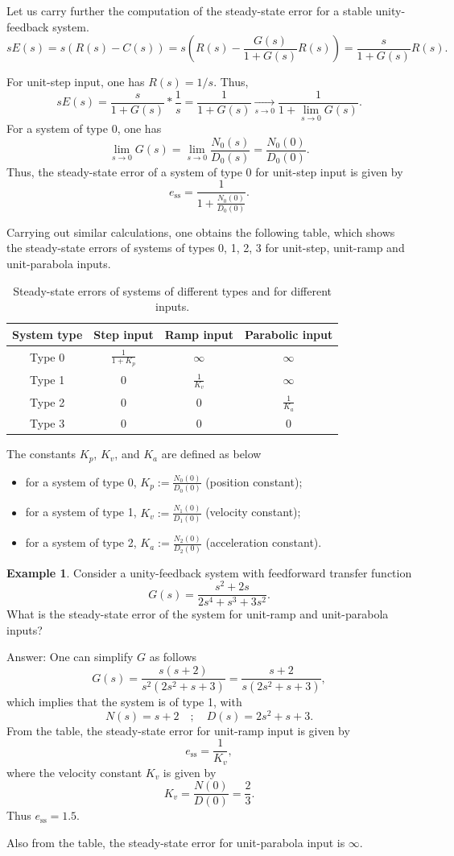 \documentclass[a4paper,11pt]{report}
\theoremstyle{definition}
\newcommand{\sse}{\mathrm{ss}}
\newtheorem{mdexample}{Example}
\newenvironment{example}%
  {\vspace{0.1cm}\begin{mdframed}[backgroundcolor=lightgray]\begin{mdexample}}%
  {\end{mdexample}\end{mdframed}\vspace{0.1cm}}
\begin{document}
Let us carry further the computation of the steady-state error for a
stable unity-feedback system.
\[
sE(s) = s(R(s)-C(s)) = s\left(R(s)-\frac{G(s)}{1+G(s)}R(s)\right)=\frac{s}{1+G(s)}R(s).
\]

For unit-step input, one has $R(s)=1/s$. Thus,
\[
sE(s) = \frac{s}{1+G(s)}*\frac{1}{s} = \frac{1}{1+G(s)}
\xrightarrow[s\to 0]{}\frac{1}{1+\lim_{s\to 0}G(s)}.
\]
For a system of type 0, one has
\[
\lim_{s\to 0}G(s) = \lim_{s\to 0}\frac{N_0(s)}{D_0(s)} = \frac{N_0(0)}{D_0(0)}.
\]
Thus, the steady-state error of a system of type 0 for unit-step input
is given by
\[
e_\sse = \frac{1}{1+\frac{N_0(0)}{D_0(0)}}.
\]

Carrying out similar calculations, one obtains the following table,
which shows the steady-state errors of systems of types 0, 1, 2, 3 for
unit-step, unit-ramp and unit-parabola inputs.

\begin{table}[htp]
  \centering
  \begin{tabular}{|c|c|c|c|}
    \hline
    System type&Step input&Ramp input&Parabolic input\\\hline
    Type 0&$\frac{1}{1+K_p}$&$\infty$&$\infty$\\\hline
    Type 1&0&$\frac{1}{K_v}$&$\infty$\\\hline
    Type 2&0&0&$\frac{1}{K_a}$\\\hline
    Type 3&0&0&0\\\hline
  \end{tabular}
  \caption{Steady-state errors of systems of different types and for
    different inputs.}
  \label{tab:systype}
\end{table}

The constants $K_p$, $K_v$, and $K_a$ are defined as below
\begin{itemize}
\item for a system of type 0, $K_p:=\frac{N_0(0)}{D_0(0)}$ (position constant);
\item for a system of type 1, $K_v:=\frac{N_1(0)}{D_1(0)}$ (velocity constant);
\item for a system of type 2, $K_a:=\frac{N_2(0)}{D_2(0)}$
  (acceleration constant).
\end{itemize}

\begin{example}
  Consider a unity-feedback system with feedforward transfer function
  \[
  G(s) = \frac{s^2+2s}{2s^4+s^3+3s^2}.
  \]
  What is the steady-state error of the system for unit-ramp and
  unit-parabola inputs?

  Answer: One can simplify $G$ as follows
  \[
  G(s) = \frac{s(s+2)}{s^2(2s^2+s+3)} =  \frac{s+2}{s(2s^2+s+3)},
  \]
  which implies that the system is of type 1, with 
  \[
  N(s) = s+2 \quad ; \quad D(s) = 2s^2+s+3.
  \]
  From the table, the steady-state error for unit-ramp input is given
  by
  \[
  e_\sse=\frac{1}{K_v},
  \]
  where the velocity constant $K_v$ is given by
  \[
  K_v = \frac{N(0)}{D(0)} = \frac{2}{3}.
  \]
  Thus $e_\sse = 1.5$.

  Also from the table, the steady-state error for unit-parabola input
  is $\infty$.
\end{example}
\end{document}
